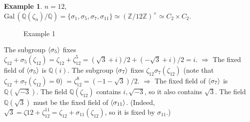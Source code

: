\documentclass{article}
\theoremstyle{definition}
\newtheorem{ex}{Example}
\newcommand{\QQ}{\mathbb Q}
\newcommand{\ZZ}{\mathbb Z}
\newcommand{\Ra}{\Rightarrow}
\newcommand{\Gal}{\text{Gal}\,}
\begin{document}
\begin{ex}
	$n = 12$, $\Gal (\QQ(\zeta_n)/\QQ) = \{\sigma_1, \sigma_5, \sigma_7, \sigma_{11}\} \simeq (\ZZ/12 \ZZ)^\times \simeq C_2 \times C_2$.

	\begin{figure}[H]
		\centering
		\caption{Example 1}
	\end{figure}
	
	The subgroup $\ev{\sigma_5}$ fixes $\zeta_{12} + \sigma_5(\zeta_{12}) = \zeta_{12} + \zeta_{12}^5 = (\sqrt{3} + i)/2 + (-\sqrt{3} + i)/2 = i$.
	$\Ra$ The fixed field of $\ev{\sigma_5}$ is $\QQ(i)$.
	The subgroup $\ev{\sigma_7}$ fixes $\zeta_{12} \sigma_7 (\zeta_{12})$ (note that $\zeta_{12} + \sigma_7 (\zeta_{12}) = 0$) $= \zeta_{12}^8 = (-1 - \sqrt{3})/2$.
	$\Ra$ The fixed field of $\ev{\sigma_7}$ is $\QQ(\sqrt{-3})$.
	The field $\QQ(\zeta_{12})$ contains $i, \sqrt{-3}$, so it also contains $\sqrt{3}$.
	The field $\QQ(\sqrt{3})$ must be the fixed field of $\ev{\sigma_{11}}$. 
	(Indeed, $\sqrt{3} = \zeta{12} + \zeta_{12}^{11} = \zeta_{12} + \sigma_{11} (\zeta_{12})$, so it is fixed by $\sigma_{11}$.)
\end{ex}
\end{document}
